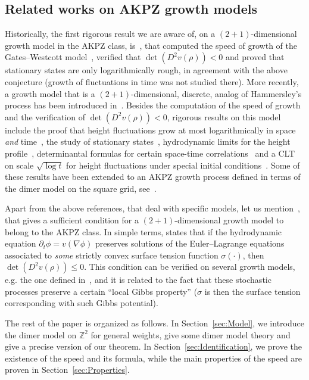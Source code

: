 \documentclass[AHL,Unicode,longabstracts,published]{cedram}
\newcommand{\bbZ}{\mathbb{Z}}
\begin{document}
\subsection{Related works on AKPZ growth models}\label{sec:relw}
Historically, the first rigorous result we are aware of, on a $(2+1)$-dimensional growth model in the AKPZ class, is~\cite{prahofer1997exactly}, that computed the speed of growth of the Gates--Westcott model~\cite{gates1995stationary}, verified that $\det(D^2 v(\rho))< 0$ and proved that stationary states are only logarithmically rough, in agreement with the above conjecture (growth of fluctuations in time was not studied there). More recently, a growth model that is a $(2+1)$-dimensional, discrete, analog of Hammersley's process has been introduced in~\cite{BF08}. Besides the computation of the speed of growth and the verification of $\det(D^2 v(\rho))< 0$, rigorous results on this model include the proof that height fluctuations grow at most logarithmically in space \emph{and} time~\cite{BF08,toninelli20172+}, the study of stationary states~\cite{toninelli20172+}, hydrodynamic limits for the height profile~\cite{BF08,legras2019hydrodynamic}, determinantal formulas for certain space-time correlations~\cite{BF08} and a CLT on scale $\sqrt{\log t}$ for height fluctuations under special initial conditions~\cite{BF08}. Some of these results have been extended to an AKPZ growth process defined in terms of the dimer model on the square grid, see~\cite{chhita2017speed}.



Apart from the above references, that deal with specific models, let us mention~\cite{borodin2018two}, that gives a sufficient condition for a $(2+1)$-dimensional growth model to belong to the AKPZ class. In simple terms, \cite[Theorem~2.1]{borodin2018two} states that if the hydrodynamic equation $\partial_t \phi=v(\nabla\phi)$ preserves solutions of the Euler--Lagrange equations associated to \emph{some} strictly convex surface tension function $\sigma(\cdot)$, then $\det(D^2 v(\rho))\le 0$. This condition can be verified on several growth models, e.g. the one defined in~\cite{BF08}, and it is related to the fact that these stochastic processes preserve a certain ``local Gibbs property'' ($\sigma$ is then the surface tension corresponding with such Gibbs potential).

The rest of the paper is organized as follows. In Section~\ref{sec:Model}, we introduce the dimer model on $\bbZ^2$ for general weights, give some dimer model theory and give a precise version of our theorem. In Section~\ref{sec:Identification}, we prove the existence of the speed and its formula, while the main properties of the speed are proven in Section~\ref{sec:Properties}.
\end{document}
